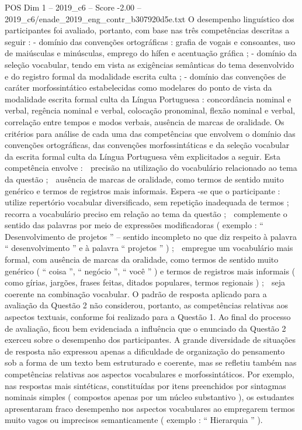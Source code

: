 \begin{textsample}{POS Dim 1 – 2019\_c6 – Score -2.00 – 2019\_c6/enade\_2019\_eng\_contr\_b307920d5e.txt}
O desempenho linguístico dos participantes foi avaliado, portanto, com base nas três competências descritas a seguir : - domínio das convenções ortográficas : grafia de vogais e consoantes, uso de maiúsculas e minúsculas, emprego do hífen e acentuação gráfica ; - domínio da seleção vocabular, tendo em vista as exigências semânticas do tema desenvolvido e do registro formal da modalidade escrita culta ; - domínio das convenções de caráter morfossintático estabelecidas como modelares do ponto de vista da modalidade escrita formal culta da Língua Portuguesa : concordância nominal e verbal, regência nominal e verbal, colocação pronominal, flexão nominal e verbal, correlação entre tempos e modos verbais, ausência de marcas de oralidade.
Os critérios para análise de cada uma das competências que envolvem o domínio das convenções ortográficas, das convenções morfossintáticas e da seleção vocabular da escrita formal culta da Língua Portuguesa vêm explicitados a seguir.
Esta competência envolve :  precisão na utilização do vocabulário relacionado ao tema da questão ;  ausência de marcas de oralidade, como termos de sentido muito genérico e termos de registros mais informais.
Espera -se que o participante :  utilize repertório vocabular diversificado, sem repetição inadequada de termos ;  recorra a vocabulário preciso em relação ao tema da questão ;  complemente o sentido das palavras por meio de expressões modificadoras ( exemplo : “ Desenvolvimento de projetos ” – sentido incompleto no que diz respeito à palavra “ desenvolvimento ” e à palavra “ projetos ” ) ;  empregue um vocabulário mais formal, com ausência de marcas da oralidade, como termos de sentido muito genérico ( “ coisa ”, “ negócio ”, “ você ” ) e termos de registros mais informais ( como gírias, jargões, frases feitas, ditados populares, termos regionais ) ;  seja coerente na combinação vocabular.
O padrão de resposta aplicado para a avaliação da Questão 2 não considerou, portanto, as competências relativas aos aspectos textuais, conforme foi realizado para a Questão 1.
Ao final do processo de avaliação, ficou bem evidenciada a influência que o enunciado da Questão 2 exerceu sobre o desempenho dos participantes.
A grande diversidade de situações de resposta não expressou apenas a dificuldade de organização do pensamento sob a forma de um texto bem estruturado e coerente, mas se refletiu também nas competências relativas aos aspectos vocabulares e morfossintáticos.
Por exemplo, nas respostas mais sintéticas, constituídas por itens preenchidos por sintagmas nominais simples ( compostos apenas por um núcleo substantivo ), os estudantes apresentaram fraco desempenho nos aspectos vocabulares ao empregarem termos muito vagos ou imprecisos semanticamente ( exemplo : “ Hierarquia ” ).

\end{textsample}
